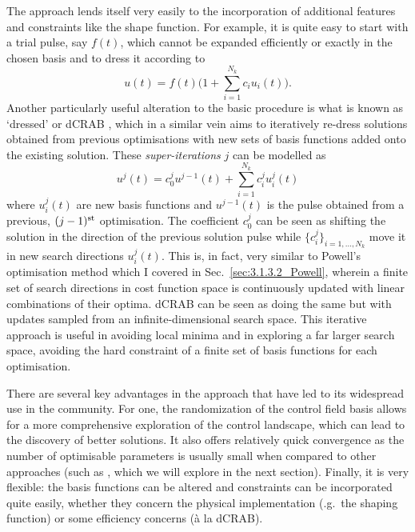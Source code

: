 The  approach lends itself very easily to the incorporation of additional features and constraints like the shape function. For example, it is quite easy to start with a trial pulse, say $f(t)$, which cannot be expanded efficiently or exactly in the chosen basis and to dress it according to
\begin{equation}\label{eq:trial_pulse_CRAB}
    u(t) = f(t)\Bigg(1 + \sum_{i = 1}^{N_k} c_i u_i(t)\Bigg).
\end{equation}
Another particularly useful alteration to the basic  procedure is what is known as `dressed'  or dCRAB \cite{rach_dressing_2015}, which in a similar vein aims to iteratively re-dress solutions obtained from previous optimisations with new sets of basis functions added onto the existing solution. These \emph{super-iterations} $j$ can be modelled as
\begin{equation}\label{eq:dCRAB}
    u^j(t) = c_0^j u^{j-1}(t) + \sum_{i = 1}^{N_k} c_i^j u^j_i(t)
\end{equation}
where $u^j_i(t)$ are new basis functions and $u^{j-1}(t)$ is the pulse obtained from a previous, $(j-1)^{\rm st}$ optimisation. The coefficient $c_0^j$ can be seen as shifting the solution in the direction of the previous solution pulse while $\{ c_i^j\}_{i = 1, ..., N_k}$ move it in new search directions $u^j_i(t)$. This is, in fact, very similar to Powell's optimisation method which I covered in Sec.~\ref{sec:3.1.3.2_Powell}, wherein a finite set of search directions in cost function space is continuously updated with linear combinations of their optima. dCRAB can be seen as doing the same but with updates sampled from an infinite-dimensional search space. This iterative approach is useful in  avoiding local minima and in exploring a far larger search space, avoiding the hard constraint of a finite set of basis functions for each optimisation. 

There are several key advantages in the  approach that have led to its widespread use in the  community. For one, the randomization of the control field basis allows for a more comprehensive exploration of the control landscape, which can lead to the discovery of better solutions. It also offers relatively quick convergence as the number of optimisable parameters is usually small when compared to other approaches (such as , which we will explore in the next section). Finally, it is very flexible: the basis functions can be altered and constraints can be incorporated quite easily, whether they concern the physical implementation (\@e.g.~the shaping function) or some efficiency concerns (à la dCRAB).

